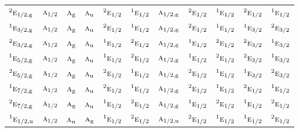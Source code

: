 \documentclass[10pt,a4paper]{article}
\numberwithin{equation}{section}
\newcommand{\irr}[1]{\text{\normalfont\scshape #1}}
\newcommand{\conjpair}[1]{{}^{#1}}
\newcommand{\ptag}[1]{\mathrm{#1}}
\begin{document}
{\begin{longtable}{@{}lcccccccccc@{}}
$\conjpair{2}\irr{e}_{1/2,\ptag{g}}$ & $\irr{a}_{1/2}$ & $\irr{a}_{\ptag{g}}$ & $\irr{a}_{\ptag{u}}$ & $\conjpair{2}\irr{e}_{1/2}$ & $\conjpair{1}\irr{e}_{1/2}$ & $\irr{a}_{1/2,\ptag{g}}$ & $\conjpair{2}\irr{e}_{1/2}$ & $\conjpair{1}\irr{e}_{1/2}$ & $\conjpair{2}\irr{e}_{1/2}$ & $\conjpair{1}\irr{e}_{1/2}$\\
$\conjpair{1}\irr{e}_{3/2,\ptag{g}}$ & $\irr{a}_{1/2}$ & $\irr{a}_{\ptag{g}}$ & $\irr{a}_{\ptag{u}}$ & $\conjpair{2}\irr{e}_{1/2}$ & $\conjpair{1}\irr{e}_{1/2}$ & $\irr{a}_{1/2,\ptag{g}}$ & $\conjpair{2}\irr{e}_{1/2}$ & $\conjpair{1}\irr{e}_{1/2}$ & $\conjpair{1}\irr{e}_{3/2}$ & $\conjpair{2}\irr{e}_{3/2}$\\
$\conjpair{2}\irr{e}_{3/2,\ptag{g}}$ & $\irr{a}_{1/2}$ & $\irr{a}_{\ptag{g}}$ & $\irr{a}_{\ptag{u}}$ & $\conjpair{1}\irr{e}_{1/2}$ & $\conjpair{2}\irr{e}_{1/2}$ & $\irr{a}_{1/2,\ptag{g}}$ & $\conjpair{1}\irr{e}_{1/2}$ & $\conjpair{2}\irr{e}_{1/2}$ & $\conjpair{2}\irr{e}_{3/2}$ & $\conjpair{1}\irr{e}_{3/2}$\\
$\conjpair{1}\irr{e}_{5/2,\ptag{g}}$ & $\irr{a}_{1/2}$ & $\irr{a}_{\ptag{g}}$ & $\irr{a}_{\ptag{u}}$ & $\conjpair{1}\irr{e}_{1/2}$ & $\conjpair{2}\irr{e}_{1/2}$ & $\irr{a}_{1/2,\ptag{g}}$ & $\conjpair{1}\irr{e}_{1/2}$ & $\conjpair{2}\irr{e}_{1/2}$ & $\conjpair{2}\irr{e}_{3/2}$ & $\conjpair{1}\irr{e}_{3/2}$\\
$\conjpair{2}\irr{e}_{5/2,\ptag{g}}$ & $\irr{a}_{1/2}$ & $\irr{a}_{\ptag{g}}$ & $\irr{a}_{\ptag{u}}$ & $\conjpair{2}\irr{e}_{1/2}$ & $\conjpair{1}\irr{e}_{1/2}$ & $\irr{a}_{1/2,\ptag{g}}$ & $\conjpair{2}\irr{e}_{1/2}$ & $\conjpair{1}\irr{e}_{1/2}$ & $\conjpair{1}\irr{e}_{3/2}$ & $\conjpair{2}\irr{e}_{3/2}$\\
$\conjpair{1}\irr{e}_{7/2,\ptag{g}}$ & $\irr{a}_{1/2}$ & $\irr{a}_{\ptag{g}}$ & $\irr{a}_{\ptag{u}}$ & $\conjpair{2}\irr{e}_{1/2}$ & $\conjpair{1}\irr{e}_{1/2}$ & $\irr{a}_{1/2,\ptag{g}}$ & $\conjpair{2}\irr{e}_{1/2}$ & $\conjpair{1}\irr{e}_{1/2}$ & $\conjpair{2}\irr{e}_{1/2}$ & $\conjpair{1}\irr{e}_{1/2}$\\
$\conjpair{2}\irr{e}_{7/2,\ptag{g}}$ & $\irr{a}_{1/2}$ & $\irr{a}_{\ptag{g}}$ & $\irr{a}_{\ptag{u}}$ & $\conjpair{1}\irr{e}_{1/2}$ & $\conjpair{2}\irr{e}_{1/2}$ & $\irr{a}_{1/2,\ptag{g}}$ & $\conjpair{1}\irr{e}_{1/2}$ & $\conjpair{2}\irr{e}_{1/2}$ & $\conjpair{1}\irr{e}_{1/2}$ & $\conjpair{2}\irr{e}_{1/2}$\\
$\conjpair{1}\irr{e}_{1/2,\ptag{u}}$ & $\irr{a}_{1/2}$ & $\irr{a}_{\ptag{u}}$ & $\irr{a}_{\ptag{g}}$ & $\conjpair{1}\irr{e}_{1/2}$ & $\conjpair{2}\irr{e}_{1/2}$ & $\irr{a}_{1/2,\ptag{u}}$ & $\conjpair{2}\irr{e}_{1/2}$ & $\conjpair{1}\irr{e}_{1/2}$ & $\conjpair{1}\irr{e}_{1/2}$ & $\conjpair{2}\irr{e}_{1/2}$\\

\end{longtable}}
\end{document}
